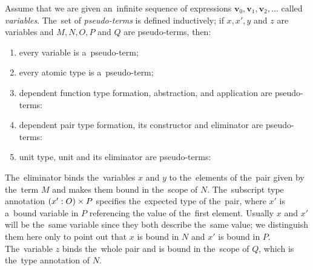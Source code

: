 \begin{definition}\label{def:pseudo-term}
  Assume that we are given an~infinite sequence of expressions $\mathbf{v}_0,
  \mathbf{v}_1, \mathbf{v}_2, \dots$ called \emph{variables}. The~set of
  \emph{pseudo-terms} is defined inductively; if $x, x', y$ and $z$ are
  variables and $M, N, O, P$ and $Q$ are pseudo-terms, then:
  \begin{enumerate}
    \item every variable is a~pseudo-term;
    \item every atomic type is a~pseudo-term;
    \item dependent function type formation, abstraction, and application
      are pseudo-terms:
    \item dependent pair type formation, its constructor and eliminator are
      pseudo-terms:
    \item unit type, unit and its eliminator are pseudo-terms:
  \end{enumerate}
\end{definition}
The~eliminator binds the~variables $x$ and $y$ to the~elements of the~pair given
by the~term $M$ and makes them bound in the~scope of $N$. The~subscript type
annotation $(x' \overset{}: O)\times P$ specifies the~expected type of the~pair, where
$x'$ is a~bound variable in $P$ referencing the value of the~first element.
Usually $x$ and $x'$ will be the~same variable since they both describe the~same
value; we distinguish them here only to point out that $x$ is bound in $N$ and
$x'$ is bound in $P$. The~variable $z$ binds the~whole pair and is bound in
the~scope of $Q$, which is the~type annotation of $N$.

